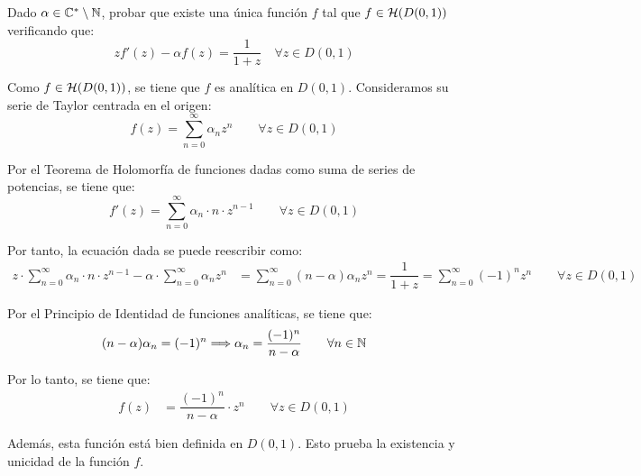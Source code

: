 \begin{ejercicio}
    Dado $\alpha \in \mathbb{C}^*\setminus \mathbb{N}$, probar que existe una única función $f$ tal que $f \in \mathcal{H}(D(0,1))$ verificando que:
    \begin{equation*}
        z f'(z) - \alpha f(z) = \frac{1}{1+z} \quad \forall z \in D(0,1)
    \end{equation*}

    Como $f\in \mathcal{H}(D(0,1))$, se tiene que $f$ es analítica en $D(0,1)$. Consideramos su serie de Taylor centrada en el origen:
    \begin{equation*}
        f(z) = \sum_{n=0}^{\infty} \alpha_n z^n \qquad \forall z \in D(0,1)
    \end{equation*}

    Por el Teorema de Holomorfía de funciones dadas como suma de series de potencias, se tiene que:
    \begin{equation*}
        f'(z) = \sum_{n=0}^{\infty} \alpha_n\cdot n\cdot z^{n-1} \qquad \forall z \in D(0,1)
    \end{equation*}

    Por tanto, la ecuación dada se puede reescribir como:
    \begin{align*}
        z\cdot \sum_{n=0}^{\infty} \alpha_n\cdot n\cdot z^{n-1} - \alpha\cdot \sum_{n=0}^{\infty} \alpha_n z^n &= \sum_{n=0}^{\infty} (n-\alpha)\alpha_n z^n
        = \dfrac{1}{1+z}=\sum_{n=0}^{\infty} (-1)^n z^n \qquad \forall z \in D(0,1)
    \end{align*}

    Por el Principio de Identidad de funciones analíticas, se tiene que:
    \begin{equation*}
        (n-\alpha)\alpha_n = (-1)^n\Longrightarrow
        \alpha_n = \frac{(-1)^n}{n-\alpha} \qquad \forall n \in \mathbb{N}
    \end{equation*}

    Por lo tanto, se tiene que:
    \begin{align*}
        f(z) &= \dfrac{(-1)^n}{n-\alpha}\cdot z^n\qquad \forall z \in D(0,1)
    \end{align*}

    Además, esta función está bien definida en $D(0,1)$. Esto prueba la existencia y unicidad de la función $f$.    
\end{ejercicio}


